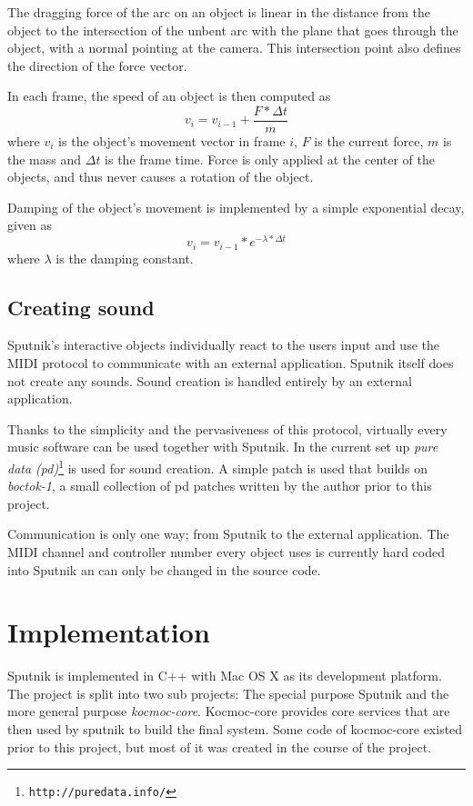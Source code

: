 \documentclass[10pt,a4paper]{scrartcl}
\begin{document}
The dragging force of the arc on an object is linear in the distance from the object to the intersection of the unbent arc with the plane that goes through the object, with a normal pointing at the camera. This intersection point also defines the direction of the force vector.

In each frame, the speed of an object is then computed as 
\begin{equation}
v_i = v_{i-1} + \frac{F * \Delta t}{m} 
\end{equation}
where $v_i$ is the object's movement vector in frame $i$, $F$ is the current force, $m$ is the mass and $\Delta t$ is the frame time. Force is only applied at the center of the objects, and thus never causes a rotation of the object.

Damping of the object's movement is implemented by a simple exponential decay, given as
\begin{equation}
v_i = v_{i-1} * e^{-\lambda * \Delta t}
\end{equation}
where $\lambda$ is the damping constant.



\subsection{Creating sound}
Sputnik's interactive objects individually react to the users input and use the MIDI protocol to communicate with an external application. Sputnik itself does not create any sounds. Sound creation is handled entirely by an external application.

Thanks to the simplicity and the pervasiveness of this protocol, virtually every music software can be used together with Sputnik. In the current set up \emph{pure data (pd)}\footnote{\texttt{http://puredata.info/}} is used for sound creation. A simple patch is used that builds on \emph{boctok-1}, a small collection of pd patches written by the author prior to this project. 

Communication is only one way; from Sputnik to the external application. The MIDI channel and controller number every object uses is currently hard coded into Sputnik an can only be changed in the source code. 


\section{Implementation}
Sputnik is implemented in C++ with Mac OS X as its development platform. The project is split into two sub projects: The special purpose Sputnik and the more general purpose \emph{kocmoc-core}. Kocmoc-core provides core services that are then used by sputnik to build the final system. Some code of kocmoc-core existed prior to this project, but most of it was created in the course of the project. 
\end{document}
